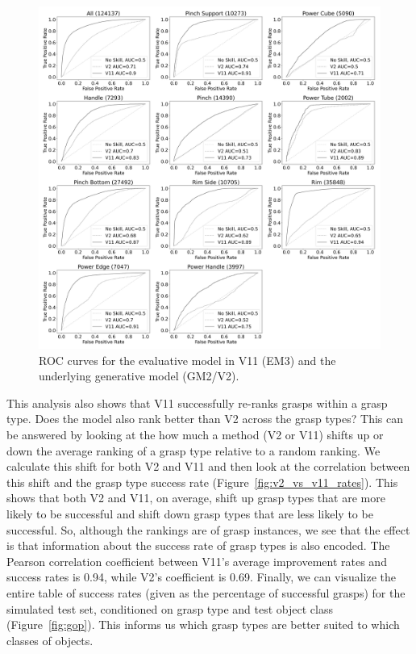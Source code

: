 \begin{figure}[h]
\centering
\includegraphics[width=0.9\columnwidth]{images/post-analysis/V11_vs_v2_ROC_across_all_scenes}
\caption{\label{fig:roc}ROC curves for the evaluative model in V11 (EM3) and the underlying generative model (GM2/V2).}
\end{figure}

This analysis also shows that V11 successfully re-ranks grasps within a grasp type. Does the model also rank better than V2 across the grasp types? This can be answered by looking at the how much a method (V2 or V11) shifts up or down the average ranking of a grasp type relative to a random ranking. We calculate this shift for both V2 and V11 and then look at the correlation between this shift and the grasp type success rate (Figure~\ref{fig:v2_vs_v11_rates}). This shows that both V2 and V11, on average, shift up grasp types that are more likely to be successful and shift down grasp types that are less likely to be successful. So, although the rankings are of grasp instances, we see that the effect is that information about the success rate of grasp types is also encoded. The Pearson correlation coefficient between V11's average improvement rates and success rates is 0.94, while V2's coefficient is 0.69. Finally, we can visualize the entire table of success rates (given as the percentage of successful grasps) for the simulated test set, conditioned on grasp type and test object class (Figure~\ref{fig:gop}). This informs us which grasp types are better suited to which classes of objects.

